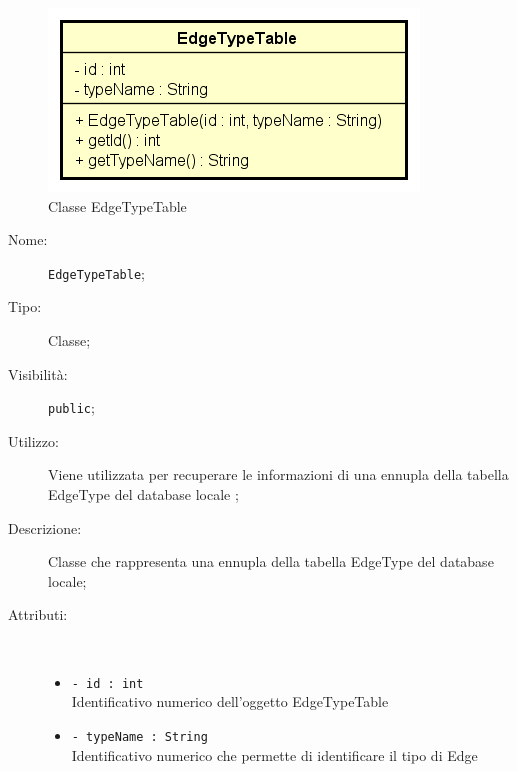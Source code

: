 \documentclass[../DefinizioneDiProdotto.tex]{subfiles}
\begin{document}
    \begin{figure}[H]
        \centering
        \includegraphics{img/EdgeTypeTable.png}
        \caption{Classe EdgeTypeTable}\label{fig:model::dataaccess::dao::EdgeTypeTable} 
    \end{figure}
    \begin{description}
\item[Nome:] \texttt{EdgeTypeTable};
\item[Tipo:] Classe;
\item[Visibilità:] \texttt{public};
\item[Utilizzo:] Viene utilizzata per recuperare le informazioni di una ennupla della tabella EdgeType del database locale ;
\item[Descrizione:] Classe che rappresenta una ennupla della tabella EdgeType del database locale;
\item[Attributi:] \
\begin{itemize}
\item \texttt{- id : int}\\
Identificativo numerico dell'oggetto EdgeTypeTable

\item \texttt{- typeName : String}\\
Identificativo numerico che permette di identificare il tipo di Edge


\end{itemize}
\end{description}
\end{document}
